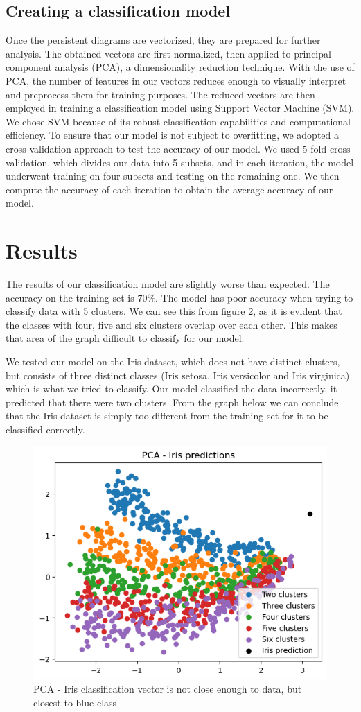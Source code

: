 \documentclass{article}
\begin{document}
\subsection{Creating a classification model}
Once the persistent diagrams are vectorized, they are prepared for further analysis. The obtained vectors are first normalized, then applied to principal component analysis (PCA), a dimensionality reduction technique. With the use of PCA, the number of features in our vectors reduces enough to visually interpret and preprocess them for training purposes. The reduced vectors are then employed in training a classification model using Support Vector Machine (SVM). We chose SVM because of its robust classification capabilities and computational efficiency. To ensure that our model is not subject to overfitting, we adopted a cross-validation approach to test the accuracy of our model. We used 5-fold cross-validation, which divides our data into 5 subsets, and in each iteration, the model underwent training on four subsets and testing on the remaining one. We then compute the accuracy of each iteration to obtain the average accuracy of our model.



\section{Results}
The results of our classification model are slightly worse than expected. The accuracy on the training set is $70\%$. The model has poor accuracy when trying to classify data with 5 clusters. We can see this from figure 2, as it is evident that the classes with four, five and six clusters overlap over each other. This makes that area of the graph difficult to classify for our model.

We tested our model on the Iris dataset, which does not have distinct clusters, but consists of three distinct classes (Iris setosa, Iris versicolor and Iris virginica) which is what we tried to classify. Our model classified the data incorrectly, it predicted that there were two clusters. From the graph below we can conclude that the Iris dataset is simply too different from the training set for it to be classified correctly.

\begin{figure}[H]
    \centering
    \includegraphics[width=0.49\linewidth]{PCAIris.png}
    \caption{PCA - Iris classification vector is not close enough to data, but closest to blue class}
\end{figure}
\end{document}
